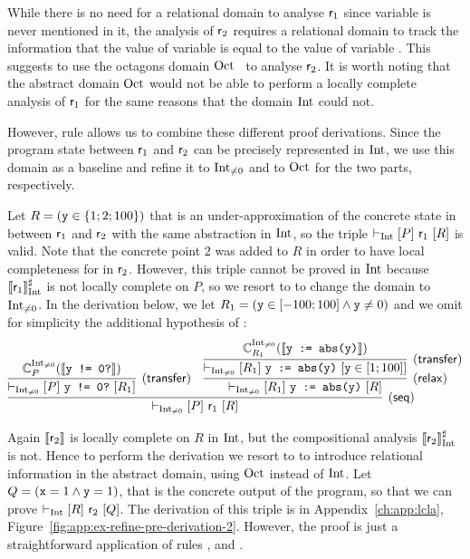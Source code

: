 \begin{example}
	While there is no need for a relational domain to analyse $\mathsf{r}_1$ since  variable  is never mentioned in it,
	the analysis of $\mathsf{r}_2$ requires a relational domain to track the information that the value of variable  is equal to the value of variable .
	This suggests to use the octagons domain $\text{Oct}$~\cite{Mine06} to analyse $\mathsf{r}_2$. It is worth noting that the abstract domain $\text{Oct}$ would not be able to perform a locally complete analysis of $\mathsf{r}_1$ for the same reasons that the domain $\text{Int}$ could not.

	However, rule  allows us to combine these different proof derivations. Since the program state between $\mathsf{r}_1$ and $\mathsf{r}_2$ can be precisely represented in $\text{Int}$, we use this domain as a baseline and refine it to $\text{Int}_{\neq 0}$ and to $\text{Oct}$ for the two parts, respectively.

	Let $R = (\texttt{y} \in \{ 1; 2; 100 \})$ that is an under\hyp{}approximation of the concrete state in between $\mathsf{r}_1$ and $\mathsf{r}_2$ with the same abstraction in $\text{Int}$, so the triple $\vdash_{\text{Int}}\nobreak[P]~\mathsf{r}_1~[R]$ is valid. Note that the concrete point $2$ was added to $R$ in order to have local completeness for  in $\mathsf{r}_2$. However, this triple cannot be proved in $\text{Int}$ because $\llbracket\mathsf{r}_1\rrbracket^{\sharp}_{\text{Int}}$ is not locally complete on $P$, so we resort to  to change the domain to $\text{Int}_{\neq 0}$.
	In the derivation below, we let $R_1 = (\texttt{y} \in [-100; 100] \land \texttt{y} \neq 0)$ and we omit for simplicity the additional hypothesis of :
	\[
	\infer[(\mathsf{seq})]
	{\lcl{\Int_{\neq 0}}{P}{\regr_1}{R}
	}
	{
		\infer[(\mathsf{transfer})]
		{\lcl{\Int_{\neq 0}}{P}{\code{y != 0?}}{R_1}}{ \complete{\Int_{\neq 0}}{P}{\denot{\code{y != 0?}}} }
		&
		\infer[(\mathsf{relax})]
		{\lcl{\Int_{\neq 0}}{R_1}{\code{y := abs(y)}}{R}}
		{\infer[(\mathsf{transfer})]
			{\lcl{\Int_{\neq 0}}{R_1}{\code{y := abs(y)}}{\code{y} \in [1; 100]}}{ \complete{\Int_{\neq 0}}{R_1}{\denot{\code{y := abs(y)}}} }
		}
	}
	\]

	Again $\llbracket\mathsf{r}_2\rrbracket$ is locally complete on $R$ in $\text{Int}$, but the compositional analysis $\llbracket\mathsf{r}_2\rrbracket^{\sharp}_{\text{Int}}$ is not. Hence to perform the derivation we resort to  to introduce relational information in the abstract domain, using $\text{Oct}$ instead of $\text{Int}$. Let $Q = (\texttt{x} = 1 \land \texttt{y} = 1)$, that is the concrete output of the program, so that we can prove $\vdash_{\text{Int}}\nobreak[R]~\mathsf{r}_2~[Q]$.
	The derivation of this triple is in Appendix~\ref{ch:app:lcla}, Figure~\ref{fig:app:ex-refine-pre-derivation-2}. However, the proof is just a straightforward application of rules ,  and .


\end{example}
